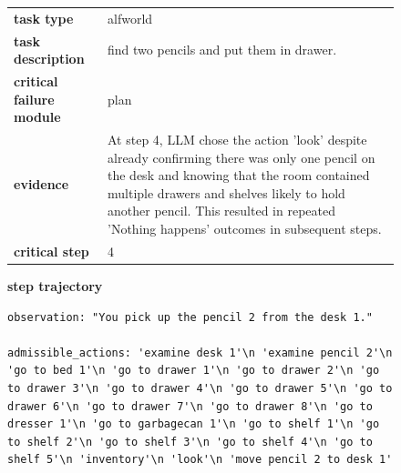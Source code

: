\documentclass[../../main.tex]{subfiles}
\begin{document}
\begin{figure}[htbp]
\centering

\begin{tcolorbox}[
    title=\textbf{Error Type - Inefficient Plan},
    colback=orange!1!white,
    colframe=orange!50!black,
    fonttitle=\bfseries,
    enhanced jigsaw,
    breakable
]
\small

\begin{tabularx}{\linewidth}{@{}lX@{}}
\textbf{task type} & alfworld \\
\textbf{task description} & find two pencils and put them in drawer. \\
\textbf{critical failure module} & plan \\
\textbf{evidence} & At step 4, LLM chose the action 'look' despite already confirming there was only one pencil on the desk and knowing that the room contained multiple drawers and shelves likely to hold another pencil. This resulted in repeated 'Nothing happens' outcomes in subsequent steps. \\
\textbf{critical step} & 4\\
\end{tabularx}

\medskip
\textbf{step trajectory}

\begin{Verbatim}[breaklines=true, breakanywhere=true]
observation: "You pick up the pencil 2 from the desk 1."

admissible_actions: 'examine desk 1'\n 'examine pencil 2'\n 'go to bed 1'\n 'go to drawer 1'\n 'go to drawer 2'\n 'go to drawer 3'\n 'go to drawer 4'\n 'go to drawer 5'\n 'go to drawer 6'\n 'go to drawer 7'\n 'go to drawer 8'\n 'go to dresser 1'\n 'go to garbagecan 1'\n 'go to shelf 1'\n 'go to shelf 2'\n 'go to shelf 3'\n 'go to shelf 4'\n 'go to shelf 5'\n 'inventory'\n 'look'\n 'move pencil 2 to desk 1'


\end{Verbatim}
\end{tcolorbox}
\end{figure}
\end{document}
